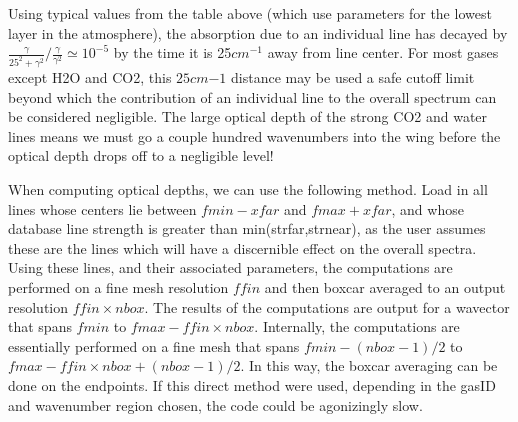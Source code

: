 \documentclass[11pt]{article}
\begin{document}
Using typical values from the table above (which use parameters for the lowest
layer in the atmosphere), the absorption due to an individual line has 
decayed by 
$ \frac{\gamma}{25^{2}+\gamma^{2}}/\frac{\gamma}{\gamma^{2}}\simeq 10^{-5}$
by the time it is 25$cm^{-1}$ away from line center. For most gases
except H2O and CO2, this $25 cm{-1}$ distance may be used a safe cutoff
limit beyond which the contribution of an individual line to the overall
spectrum can be considered negligible.  The large optical depth of the
strong CO2 and water lines means we must go a couple hundred wavenumbers
into the wing before the optical depth drops off to a negligible level!

When computing optical depths, we can use the following method. Load in all 
lines whose centers lie 
between $fmin - xfar$ and $fmax + xfar$, and whose database line strength 
is greater than min(strfar,strnear), as the user assumes these are the 
lines which will have a discernible effect on the overall spectra. Using 
these lines, and their associated parameters, the computations are 
performed on a fine mesh resolution $ffin$ and then boxcar
averaged to an output resolution $ffin \times nbox$. The results of the 
computations are output for a wavector that spans $fmin$ to $fmax-ffin 
\times nbox$. Internally, the computations are essentially performed on a 
fine mesh that spans $fmin - (nbox-1)/2 $ to $fmax-ffin \times nbox + 
(nbox-1)/2$. In this way, the boxcar averaging can be done on the endpoints.
If this direct method were used, depending in the gasID and wavenumber 
region chosen, the code could be agonizingly slow. 
\end{document}
